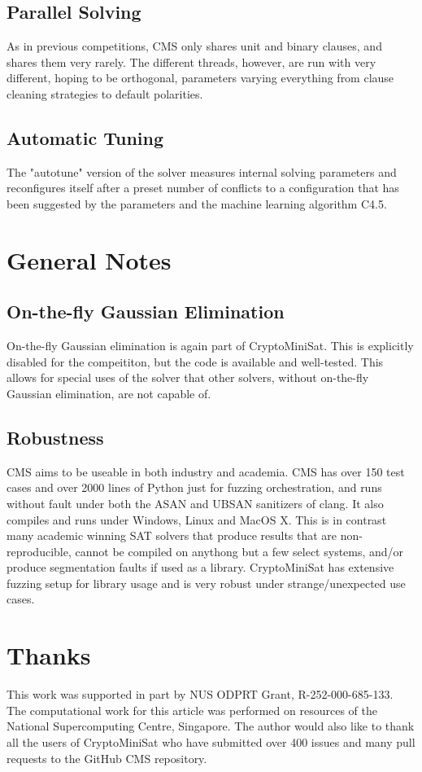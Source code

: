 \documentclass[final]{ieee}
\begin{document}
\subsection{Parallel Solving}
As in previous competitions, CMS only shares unit and binary clauses, and shares them very rarely. The different threads, however, are run with very different, hoping to be orthogonal, parameters varying everything from clause cleaning strategies to default polarities.

\subsection{Automatic Tuning}
The "autotune" version of the solver measures internal solving parameters and reconfigures itself after a preset number of conflicts to a configuration that has been suggested by the parameters and the machine learning algorithm C4.5\cite{Salzberg1994}.

\section{General Notes}
\subsection{On-the-fly Gaussian Elimination}
On-the-fly Gaussian elimination is again part of CryptoMiniSat. This is explicitly disabled for the compeititon, but the code is available and well-tested. This allows for special uses of the solver that other solvers, without on-the-fly Gaussian elimination, are not capable of.

\subsection{Robustness}
CMS aims to be useable in both industry and academia. CMS has over 150 test cases and over 2000 lines of Python just for fuzzing orchestration, and runs without fault under both the ASAN and UBSAN sanitizers of clang. It also compiles and runs under Windows, Linux and MacOS X. This is in contrast many academic winning SAT solvers that produce results that are non-reproducible, cannot be compiled on anythong but a few select systems, and/or produce segmentation faults if used as a library. CryptoMiniSat has extensive fuzzing setup for library usage and is very robust under strange/unexpected use cases.

\section{Thanks}
This work was supported in part by NUS ODPRT Grant, R-252-000-685-133. The computational work for this article was performed on resources of the National Supercomputing Centre, Singapore\cite{nscc}. The author would also like to thank all the users of CryptoMiniSat who have submitted over 400 issues and many pull requests to the GitHub CMS repository\cite{CMS}.





\vfill
\pagebreak
\end{document}
